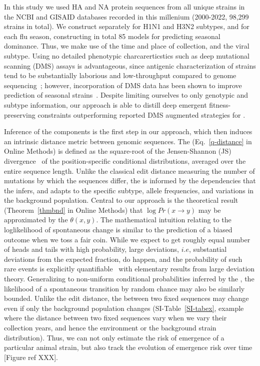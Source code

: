 \documentclass[onecolumn, compsoc,10pt]{IEEEtran}
\def\METHODS{Online Methods\xspace}
\begin{document}
In this study we used  HA and NA protein sequences from  all unique \infl strains in the NCBI and GISAID databases recorded in this millenium (2000-2022,  98,299 strains in total). We  construct  separately for H1N1 and H3N2 subtypes, and for each flu season, constructing in total 85 models for predicting seasonal dominance. %
Thus, we make use of  the time and place of collection, and the viral subtype.
Using no detailed phenotypic charcarerticstics such as deep mutational scanning (DMS) assays is advantageous, since antigenic characterization of  \infl strains tend to be substantially  laborious and low-throughput compared to genome sequencing~\cite{wood2012reproducibility}; however,  incorporation of DMS data has been shown to improve prediction of seasonal strains~\cite{huddleston2020integrating}. Despite limiting ourselves to only genotypic and subtype information, our approach is able to distill deep emergent  fitness-preserving constraints   outperforming reported DMS  augmented strategies for \infl.

 
Inference of the \enet components is the first step in our approach, which then induces  an intrinsic distance metric between genomic sequences. The \qdist  (Eq.~\eqref{q-distance} in \METHODS) is defined as the square-root of the Jensen-Shannon (JS) divergence~\cite{cover} of the position-specific conditional distributions, averaged over the entire sequence length. Unlike the classical edit distance measuring the number of mutations by which the sequences differ, the \qdist is informed by the   dependencies that the \enet infers, and adapts to the specific subtype, allele frequencies, and variations in the background population. Central to our approach is the theoretical result (Theorem~\ref{thmbnd} in \METHODS) that   $\log Pr(x \rightarrow y )$   may be approximated by the  \qdist $\theta(x,y)$. The mathematical intuition  relating  \qdist  to the loglikelihood of spontaneous change  is similar to the prediction of  a biased outcome when we  toss a fair coin. While we expect to get roughly equal number of heads and tails with high probability,  large deviations, $i.e$, substantial deviations from the expected fraction,  do happen, and the probability of such rare events is explicitly quantifiable~\cite{varadhan2010large} with elementary results from large deviation theory. Generalizing to non-uniform conditional probabilities inferred by the \enet, the likelihood of a spontaneous transition  by random chance may also be similarly bounded. Unlike the edit distance, the \qdist  between two fixed sequences may change even if only the background population changes (SI-Table~\ref{SI-tabex}, example where  the distance between two fixed  sequences vary when we vary their collection years, and hence the environment or the background strain distribution). Thus, we can not only estimate the risk of emergence of a particular animal strain, but also track the evolution of emergence risk over time [Figure ref XXX].
\end{document}
